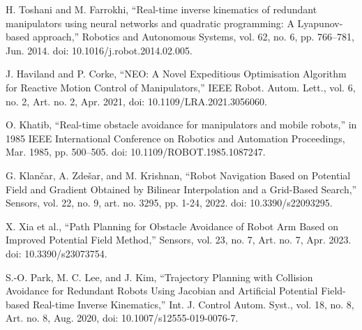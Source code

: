 \documentclass[letterpaper, 10 pt, conference]{ieeeconf}  %
\begin{document}
\begin{thebibliography}{99}
 H. Toshani and M. Farrokhi, “Real-time inverse kinematics of redundant manipulators using neural networks and quadratic programming: A Lyapunov-based approach,” Robotics and Autonomous Systems, vol. 62, no. 6, pp. 766–781, Jun. 2014. doi: 10.1016/j.robot.2014.02.005.

 J. Haviland and P. Corke, “NEO: A Novel Expeditious Optimisation Algorithm for Reactive Motion Control of Manipulators,” IEEE Robot. Autom. Lett., vol. 6, no. 2, Art. no. 2, Apr. 2021, doi: 10.1109/LRA.2021.3056060.


 O. Khatib, “Real-time obstacle avoidance for manipulators and mobile robots,” in 1985 IEEE International Conference on Robotics and Automation Proceedings, Mar. 1985, pp. 500–505. doi: 10.1109/ROBOT.1985.1087247.




G. Klančar, A. Zdešar, and M. Krishnan, “Robot Navigation Based on Potential Field and Gradient Obtained by Bilinear Interpolation and a Grid-Based Search,” Sensors, vol. 22, no. 9, art. no. 3295, pp. 1-24, 2022. doi: 10.3390/s22093295.

 X. Xia et al., “Path Planning for Obstacle Avoidance of Robot Arm Based on Improved Potential Field Method,” Sensors, vol. 23, no. 7, Art. no. 7, Apr. 2023. doi: 10.3390/s23073754.

 S.-O. Park, M. C. Lee, and J. Kim, “Trajectory Planning with Collision Avoidance for Redundant Robots Using Jacobian and Artificial Potential Field-based Real-time Inverse Kinematics,” Int. J. Control Autom. Syst., vol. 18, no. 8, Art. no. 8, Aug. 2020, doi: 10.1007/s12555-019-0076-7.


\end{thebibliography}
\end{document}
